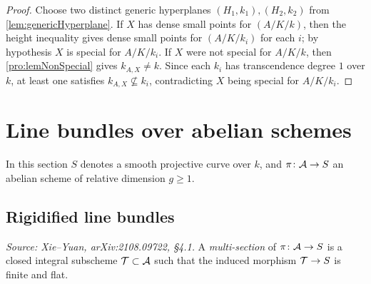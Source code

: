\begin{proof}
  Choose two distinct generic hyperplanes \((H_1,k_1),(H_2,k_2)\) from
  \cref{lem:genericHyperplane}.
  If \(X\) has dense small points for \((A/K/k)\), then the height inequality gives dense
  small points for \((A/K/k_i)\) for each \(i\); by hypothesis \(X\) is special for
  \(A/K/k_i\).
  If \(X\) were not special for \(A/K/k\), then \cref{pro:lemNonSpecial} gives \(k_{A,X} \neq k\).
  Since each \(k_i\) has transcendence degree \(1\) over \(k\), at least one satisfies
  \(k_{A,X} \not\subseteq k_i\), contradicting \(X\) being special for \(A/K/k_i\).
\end{proof}

\section{Line bundles over abelian schemes}
\label{sec:linebundles}

In this section \(S\) denotes a smooth projective curve over \(k\), and
\(\pi\colon \mathcal{A} \to S\) an abelian scheme of relative dimension \(g \geq 1\).

\subsection{Rigidified line bundles}

\begin{definition}
  \label{def:MultiSection}
  \uses{}
  \textit{Source: Xie--Yuan, arXiv:2108.09722, \S4.1.}
  A \emph{multi-section} of \(\pi\colon \mathcal{A} \to S\) is a closed integral subscheme
  \(\mathcal{T} \subset \mathcal{A}\) such that the induced morphism \(\mathcal{T} \to S\) is finite and flat.
\end{definition}

